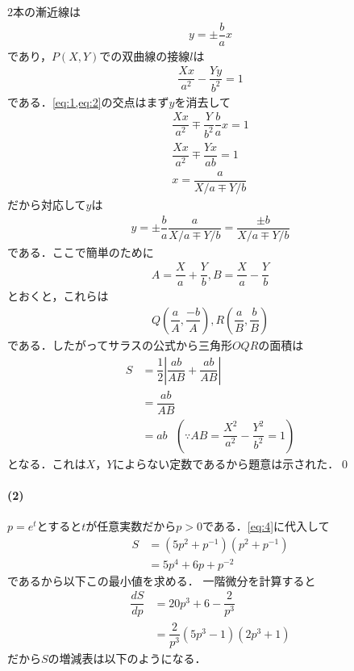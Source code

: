 \documentclass[../../main.tex]{subfiles}
\begin{document}
$2$本の漸近線は
\begin{align}
  y=\pm\dfrac{b}{a}x \label{eq:1}
\end{align}
であり，$P(X,Y)$での双曲線の接線$l$は
\begin{align}
  \dfrac{Xx}{a^2}-\dfrac{Yy}{b^2}=1 \label{eq:2}
\end{align}
である．\cref{eq:1,eq:2}の交点はまず$y$を消去して
\begin{align}
  \dfrac{Xx}{a^2}\mp\dfrac{Y}{b^2}\dfrac{b}{a}x =1 \\
  \dfrac{Xx}{a^2}\mp\dfrac{Yx}{ab} =1 \\
  x = \dfrac{a}{X/a \mp Y/b}
\end{align}
だから対応して$y$は
\begin{align}
  y = \pm\dfrac{b}{a} \dfrac{a}{X/a \mp Y/b} = \dfrac{\pm b}{X/a \mp Y/b}
\end{align}
である．ここで簡単のために
\begin{align}
  A=\dfrac{X}{a}+\dfrac{Y}{b} , B=\dfrac{X}{a}-\dfrac{Y}{b} \label{eq:3}
\end{align}
とおくと，これらは
\begin{align}
  Q\left(\dfrac{a}{A},\dfrac{-b}{A}\right),R\left(\dfrac{a}{B},\dfrac{b}{B}\right)
\end{align}
である．したがってサラスの公式から三角形$OQR$の面積は
\begin{align}
  S&=\dfrac{1}{2}\left|\dfrac{ab}{AB}+\dfrac{ab}{AB}\right|  \nonumber\\
  &=\dfrac{ab}{AB}  \nonumber\\
  &=ab \ \ \ \left(\because AB=\dfrac{X^2}{a^2}-\dfrac{Y^2}{b^2}=1\right)  \label{eq:4}
\end{align}
となる．これは$X$，$Y$によらない定数であるから題意は示された．\qed

\paragraph{(2)}

$p=e^t$とすると$t$が任意実数だから$p>0$である．\cref{eq:4}に代入して
\begin{align}
  S&=(5p^2+p^{-1})(p^2+p^{-1})\nonumber \\
  &=5p^4+6p+p^{-2} \label{eq:5}
\end{align}
であるから以下この最小値を求める．
一階微分を計算すると
\begin{align}
  \dfrac{dS}{dp}&=20p^3+6-\dfrac{2}{p^3} \\
  &=\dfrac{2}{p^3}(5p^3-1)(2p^3+1)
\end{align}
だから$S$の増減表は以下のようになる．
\end{document}
